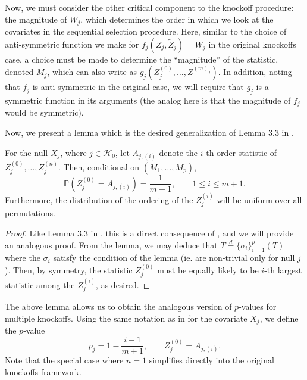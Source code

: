 \documentclass[11pt,reqno]{report}
\theoremstyle{definition}
\numberwithin{equation}{section}
\begin{document}
Now, we must consider the other critical component to the knockoff procedure: the magnitude of $W_j$, which determines the order in which we look at the covariates in the sequential selection procedure. Here, similar to the choice of anti-symmetric function we make for $f_j(Z_j, \tilde{Z}_j) = W_j$ in the original knockoffs case, a choice must be made to determine the ``magnitude'' of the statistic, denoted $M_j$, which can also write as $g_j(Z^{(0)}_j,\ldots, Z^{(m)_j})$. In addition, noting that $f_j$ is anti-symmetric in the original case, we will require that $g_j$ is a symmetric function in its arguments (the analog here is that the magnitude of $f_j$ would be symmetric). 


Now, we present a lemma which is the desired generalization of Lemma 3.3 in \cite{panning}.
\begin{lem}
\label{lemma2.4}
For the null $X_j$, where $j \in \mathcal{H}_0$, let $A_{j, (i)}$ denote the $i$-th order statistic of $Z_j^{(0)}, \ldots, Z_j^{(n)}$. Then, conditional on $(M_1, \ldots, M_p)$,
\begin{equation}
\mathbb{P}\left(Z_j^{(0)} = A_{j, (i)} \right) = \frac{1}{m+1}, \qquad 1 \leq i \leq m + 1.
\end{equation}
Furthermore, the distribution of the ordering of the $Z_j^{(i)}$ will be uniform over all permutations.
\end{lem}
\begin{proof}
Like Lemma 3.3 in \cite{panning}, this is a direct consequence of \hyperref[lemma2.3]{}, and we will provide an analogous proof. From the lemma, we may deduce that $T \overset{d}{=} \{ \sigma_i \}_{i=1}^p \left( T \right)$ where the $\sigma_i$ satisfy the condition of the lemma (ie. are non-trivial only for null $j$). Then, by symmetry, the statistic $Z_j^{(0)}$ must be equally likely to be $i$-th largest statistic among the $Z_j^{(i)}$, as desired.
\end{proof}
The above lemma allows us to obtain the analogous version of $p$-values for multiple knockoffs. Using the same notation as in \hyperref[lemma2.4]{} for the covariate $X_j$, we define the $p$-value
\begin{equation}
p_j = 1 - \frac{i - 1}{m+1}, \qquad Z_j^{(0)} = A_{j, (i)}.
\end{equation}
Note that the special case where $n = 1$ simplifies directly into the original knockoffs framework.
\end{document}
